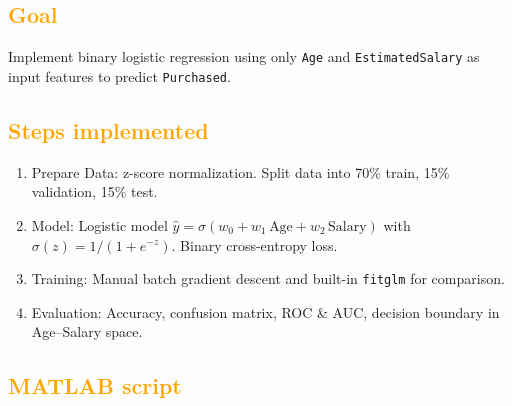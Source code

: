 \documentclass[11pt,a4paper]{article}
\begin{document}
\subsection{\textcolor{orange}{Goal}}
Implement binary logistic regression using only \texttt{Age} and \texttt{EstimatedSalary} as input features to predict \texttt{Purchased}.

\subsection{\textcolor{orange}{Steps implemented}}
\begin{enumerate}
  \item Prepare Data: z-score normalization. Split data into 70\% train, 15\% validation, 15\% test.
  \item Model: Logistic model \(\hat{y}=\sigma(w_0 + w_1 \, \text{Age} + w_2 \, \text{Salary})\) with \(\sigma(z)=1/(1+e^{-z})\). Binary cross-entropy loss.
  \item Training: Manual batch gradient descent and built-in \texttt{fitglm} for comparison.
  \item Evaluation: Accuracy, confusion matrix, ROC \& AUC, decision boundary in Age--Salary space.
\end{enumerate}

\subsection{\textcolor{orange}{MATLAB script}}
\end{document}
